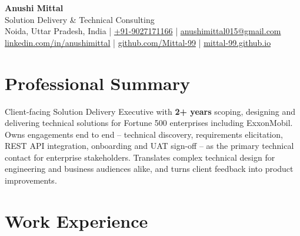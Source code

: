 \documentclass[a4paper,10pt]{article}
\begin{document}
\begin{center}
  {\LARGE\bfseries\textcolor{accent}{Anushi Mittal}}\\[3pt]
  {\normalsize Solution Delivery \& Technical Consulting}\\[3pt]
  {\small
    Noida, Uttar Pradesh, India \textcolor{rulegrey}{|}
    \href{tel:+919027171166}{+91-9027171166} \textcolor{rulegrey}{|}
    \href{mailto:anushimittal015@gmail.com}{anushimittal015@gmail.com}
  }\\[3pt]
  {\small
    \href{https://www.linkedin.com/in/anushimittal}{linkedin.com/in/anushimittal} \textcolor{rulegrey}{|}
    \href{https://github.com/Mittal-99}{github.com/Mittal-99} \textcolor{rulegrey}{|}
    \href{https://mittal-99.github.io}{mittal-99.github.io}
  }
\end{center}
\vspace{-2pt}

\section{Professional Summary}
Client-facing Solution Delivery Executive with \textbf{2+ years} scoping, designing and delivering technical solutions for Fortune 500
enterprises including ExxonMobil. Owns engagements end to end -- technical discovery, requirements elicitation, REST API integration,
onboarding and UAT sign-off -- as the primary technical contact for enterprise stakeholders. Translates complex technical design for
engineering and business audiences alike, and turns client feedback into product improvements.

\section{Work Experience}
\end{document}
